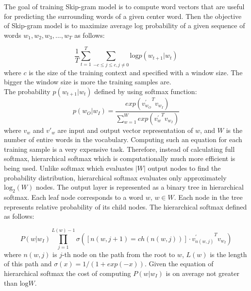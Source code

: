 \begin{itemize}
The goal of training Skip-gram model is to compute word vectors that are useful for predicting the surrounding words of a given center word. Then the objective of Skip-gram model is to maximize average log probability of a given sequence of words $w_1, w_2, w_3, ..., w_T$ as follows: 

\begin{equation}
\frac{1}{T}\sum_{t=1}^{T}\sum_{-c \leq j\leq c, j\neq0 } \textrm{log} p(w_{t+1}|w_{t})
\end{equation}
where $c$ is the size of the training context and specified with a window size. The bigger the window size is more the training samples are. \\
The probability $p(w_{t+1}|w_{t})$ defined by using softmax function: 
\begin{equation}
p(w_{O}|w_{I})=\frac{exp({v^{'}_{w_O}}^{T} {v}_{w_{I}})}{\sum\limits_{w=1}^{W} exp({v^{'}_w}^{T} {v}_{w_{I}})}
\end{equation}
where $v_w$ and $v'_w$ are input and output vector representation of $w$, and $W$ is the number of entire words in the vocabulary. Computing such an equation for each training sample is a very expensive task. Therefore, instead of calculating full softmax, hierarchical softmax which is computationally much more efficient is being used. Unlike softmax which evaluates $|W|$ output nodes to find the probability distribution, hierarchical softmax evaluates only approximately $\textrm{log}_2(W)$ nodes. The output layer is represented as a binary tree in hierarchical softmax. Each leaf node corresponds to a word $w$, $w \in W$. Each node in the tree represents relative probability of its child nodes. The hierarchical softmax defined as follows:

\begin{equation}
\displaystyle P(w|w_I) \prod_{j=1}^{L(w)-1} \sigma([n(w,j+1)=ch(n(w,j))]\cdot {v^{'}_{n(w,j)}}^{T} {v}_{w_{I}} )  
\end{equation}
where $n(w,j)$ is $j$-th node on the path from the root to $w$, $L(w)$ is the length of this path and $\sigma(x)=1/(1+exp(-x))$. Given the equation of hierarchical softmax the cost of computing $P(w|w_I)$ is on average not greater than $\textrm{log}W$.\\


\end{itemize}
